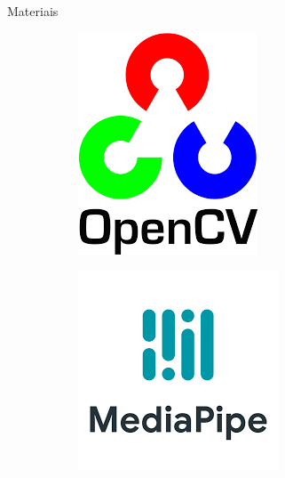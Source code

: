 \begin{frame}{Materiais}
\begin{figure}[!ht]
\begin{subfigure}[H]{0.2\textwidth}
            \includegraphics[width=\textwidth]{img/logo/OpenCv.png}
            \label{fig_op_af}
          \end{subfigure}
          \hspace*{0.80cm}
          \begin{subfigure}[H]{0.3\textwidth}
            \includegraphics[width=\textwidth]{img/logo/MediaPipe.png}

\end{subfigure}
\end{figure}
\end{frame}
